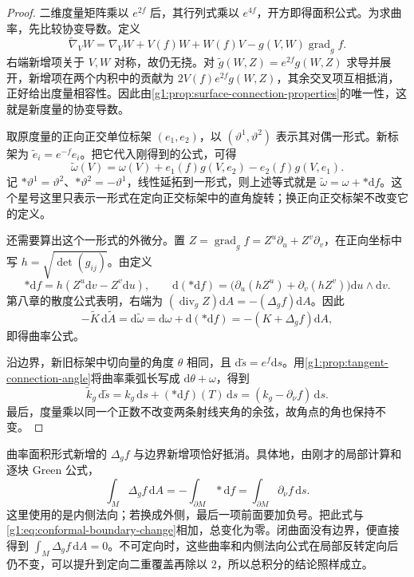 \begin{proof}
	二维度量矩阵乘以 \(e^{2f}\) 后，其行列式乘以 \(e^{4f}\)，开方即得面积公式。为求曲率，先比较协变导数。定义
	\[
		\widetilde\nabla_VW=\nabla_VW+V(f)W+W(f)V-g(V,W)\operatorname{grad}_g f.
	\]
	右端新增项关于 \(V,W\) 对称，故仍无挠。对 \(\widetilde g(W,Z)=e^{2f}g(W,Z)\) 求导并展开，新增项在两个内积中的贡献为 \(2V(f)e^{2f}g(W,Z)\)，其余交叉项互相抵消，正好给出度量相容性。因此由\cref{g1:prop:surface-connection-properties}的唯一性，这就是新度量的协变导数。

	取原度量的正向正交单位标架 \((e_1,e_2)\)，以 \((\vartheta^1,\vartheta^2)\) 表示其对偶一形式。新标架为 \(\widetilde e_i=e^{-f}e_i\)。把它代入刚得到的公式，可得
	\[
		\widetilde\omega(V)=\omega(V)+e_1(f)g(V,e_2)-e_2(f)g(V,e_1).
	\]
	记 \(*\vartheta^1=\vartheta^2\)、\(*\vartheta^2=-\vartheta^1\)，线性延拓到一形式，则上述等式就是 \(\widetilde\omega=\omega+*\mathrm{d}f\)。这个星号这里只表示一形式在定向正交标架中的直角旋转；换正向正交标架不改变它的定义。

	还需要算出这个一形式的外微分。置 \(Z=\operatorname{grad}_g f=Z^u\partial_u+Z^v\partial_v\)，在正向坐标中写 \(h=\sqrt{\det(g_{ij})}\)。由定义
	\[
		*\mathrm{d}f=h(Z^u\mathrm{d}v-Z^v\mathrm{d}u),\qquad
		\mathrm{d}(*\mathrm{d}f)=\bigl(\partial_u(hZ^u)+\partial_v(hZ^v)\bigr)\mathrm{d}u\wedge\mathrm{d}v.
	\]
	第八章的散度公式表明，右端为 \((\operatorname{div}_g Z)\mathrm{d}A=-(\Delta_g f)\mathrm{d}A\)。因此
	\[
		-\widetilde K\,\mathrm{d}\widetilde A
		=\mathrm{d}\widetilde\omega
		=\mathrm{d}\omega+\mathrm{d}(*\mathrm{d}f)
		=-(K+\Delta_g f)\mathrm{d}A,
	\]
	即得曲率公式。

	沿边界，新旧标架中切向量的角度 \(\theta\) 相同，且 \(\mathrm{d}\widetilde s=e^f\mathrm{d}s\)。用\cref{g1:prop:tangent-connection-angle}将曲率乘弧长写成 \(\mathrm{d}\theta+\omega\)，得到
	\[
		\widetilde k_g\,\mathrm{d}\widetilde s
		=k_g\,\mathrm{d}s+(*\mathrm{d}f)(T)\,\mathrm{d}s
		=(k_g-\partial_\nu f)\,\mathrm{d}s.
	\]
	最后，度量乘以同一个正数不改变两条射线夹角的余弦，故角点的角也保持不变。
\end{proof}

曲率面积形式新增的 \(\Delta_g f\) 与边界新增项恰好抵消。具体地，由刚才的局部计算和逐块 Green 公式，
\[
	\int_M\Delta_g f\,\mathrm{d}A
	=-\int_{\partial M}*\mathrm{d}f
	=\int_{\partial M}\partial_\nu f\,\mathrm{d}s.
\]
这里使用的是内侧法向；若换成外侧，最后一项前面要加负号。把此式与\eqref{g1:eq:conformal-boundary-change}相加，总变化为零。闭曲面没有边界，便直接得到 \(\int_M\Delta_g f\,\mathrm{d}A=0\)。不可定向时，这些曲率和内侧法向公式在局部反转定向后仍不变，可以提升到定向二重覆盖再除以 \(2\)，所以总积分的结论照样成立。

